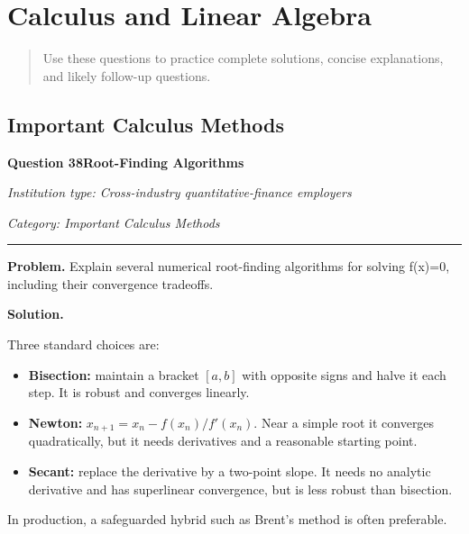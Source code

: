 \documentclass[11pt,letterpaper,openany]{book}
\newcommand{\ChapterIntro}[1]{%
  \begin{quote}\small #1\end{quote}%
}
\newcommand{\FoundationQuestionHeader}[3]{%
  \vspace{1.0em}%
  {\large\bfseries #1\enspace #2\par}%
  {\small\itshape Institution type: Cross-industry quantitative-finance employers\par}%
  {\small\itshape Category: #3\par}%
  \vspace{0.25em}\hrule\vspace{0.45em}%
}
\begin{document}
\section{Calculus and Linear Algebra}

\ChapterIntro{Use these questions to practice complete solutions, concise explanations, and likely follow-up questions.}

\subsection{Important Calculus Methods}

\FoundationQuestionHeader{Question 38}{Root-Finding Algorithms}{Important Calculus Methods}

\textbf{Problem.} Explain several numerical root-finding algorithms for solving f(x)=0, including their convergence tradeoffs.


\textbf{Solution.}

Three standard choices are:
\begin{itemize}
\item \textbf{Bisection:} maintain a bracket \([a,b]\) with opposite signs and halve it each step. It is robust and converges linearly.
\item \textbf{Newton:} \(x_{n+1}=x_n-f(x_n)/f'(x_n)\). Near a simple root it converges quadratically, but it needs derivatives and a reasonable starting point.
\item \textbf{Secant:} replace the derivative by a two-point slope. It needs no analytic derivative and has superlinear convergence, but is less robust than bisection.
\end{itemize}
In production, a safeguarded hybrid such as Brent's method is often preferable.
\end{document}
